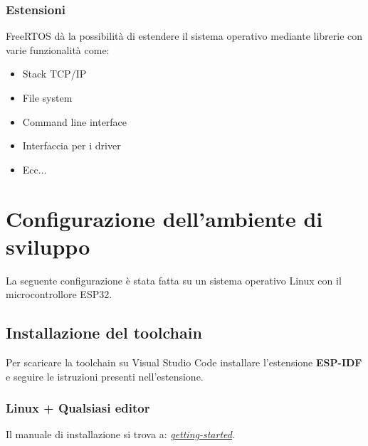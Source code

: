 \documentclass[a4paper]{article}
\begin{document}
\subsubsection{Estensioni}
FreeRTOS dà la possibilità di estendere il sistema operativo mediante librerie con
varie funzionalità come:
\begin{itemize}
  \item Stack TCP/IP
  \item File system
  \item Command line interface
  \item Interfaccia per i driver
  \item Ecc...
\end{itemize}

\section{Configurazione dell'ambiente di sviluppo}
La seguente configurazione è stata fatta su un sistema operativo Linux con il 
microcontrollore ESP32.

\subsection{Installazione del toolchain}
Per scaricare la toolchain su Visual Studio Code installare l'estensione \textbf{ESP-IDF}
e seguire le istruzioni presenti nell'estensione.

\subsubsection{Linux + Qualsiasi editor}
Il manuale di installazione si trova a: \href{https://docs.espressif.com/projects/esp-idf/en/v5.4/esp32/get-started/linux-macos-setup.html}{\textit{\underline{getting-started}}}.
\end{document}
